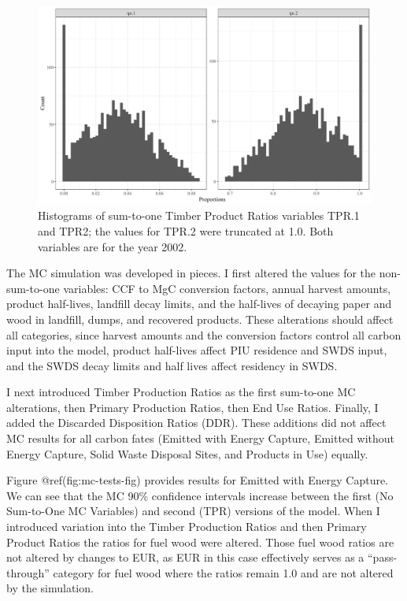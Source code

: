 \documentclass[
  openany]{book}
\begin{document}
\begin{figure}
\includegraphics[width=1\linewidth]{images/triang3} \caption{Histograms of sum-to-one Timber Product Ratios variables TPR.1 and TPR2; the values for TPR.2 were truncated at 1.0.  Both variables are for the year 2002.}\label{fig:mc-tri3-fig}
\end{figure}

The MC simulation was developed in pieces. I first altered the values
for the non-sum-to-one variables: CCF to MgC conversion factors, annual
harvest amounts, product half-lives, landfill decay limits, and the
half-lives of decaying paper and wood in landfill, dumps, and recovered
products. These alterations should affect all categories, since harvest
amounts and the conversion factors control all carbon input into the
model, product half-lives affect PIU residence and SWDS input, and the
SWDS decay limits and half lives affect residency in SWDS.

I next introduced Timber Production Ratios as the first sum-to-one MC
alterations, then Primary Production Ratios, then End Use Ratios.
Finally, I added the Discarded Disposition Ratios (DDR). These additions
did not affect MC results for all carbon fates (Emitted with Energy
Capture, Emitted without Energy Capture, Solid Waste Disposal Sites, and
Products in Use) equally.

Figure @ref(fig:mc-tests-fig) provides results for Emitted with Energy
Capture. We can see that the MC 90\% confidence intervals increase
between the first (No Sum-to-One MC Variables) and second (TPR) versions
of the model. When I introduced variation into the Timber Production
Ratios and then Primary Product Ratios the ratios for fuel wood were
altered. Those fuel wood ratios are not altered by changes to EUR, as
EUR in this case effectively serves as a ``pass-through'' category for
fuel wood where the ratios remain 1.0 and are not altered by the
simulation.
\end{document}
